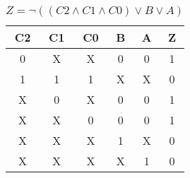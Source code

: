 
\begin{center}
    \begin{table}[h] \caption{\(Z = \lnot ((C2 \land C1 \land C0) \lor B \lor A) \)}
        \begin{center}
            \begin{tabular}{|c|c|c|c|c||c|} \hline
            C2 & C1 & C0 & B & A & Z \\ \hline\hline
            0  & X  & X  & 0 & 0 & 1 \\ \hline
            1  & 1  & 1  & X & X & 0 \\ \hline
            X  & 0  & X  & 0 & 0 & 1 \\ \hline
            X  & X  & 0  & 0 & 0 & 1 \\ \hline
            X  & X  & X  & 1 & X & 0 \\ \hline
            X  & X  & X  & X & 1 & 0 \\ \hline
            \end{tabular}
        \end{center}
    \end{table}
\end{center}

